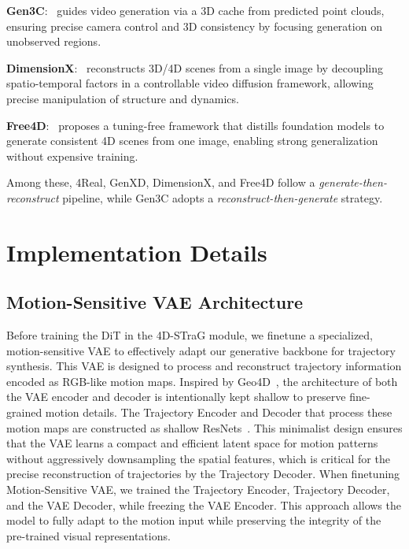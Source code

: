 \noindent\textbf{Gen3C}:~\cite{gen3c} guides video generation via a 3D cache from predicted point clouds, ensuring precise camera control and 3D consistency by focusing generation on unobserved regions.

\noindent\textbf{DimensionX}:~\cite{dimensionX} reconstructs 3D/4D scenes from a single image by decoupling spatio-temporal factors in a controllable video diffusion framework, allowing precise manipulation of structure and dynamics.

\noindent\textbf{Free4D}:~\cite{free4d} proposes a tuning-free framework that distills foundation models to generate consistent 4D scenes from one image, enabling strong generalization without expensive training.

Among these, 4Real, GenXD, DimensionX, and Free4D follow a \textit{generate-then-reconstruct} pipeline, while Gen3C adopts a \textit{reconstruct-then-generate} strategy.




\section{ Implementation Details}
\label{sec:f}
\subsection{Motion-Sensitive VAE Architecture}

Before training the DiT in the 4D-STraG module, we finetune a specialized, motion-sensitive VAE to effectively adapt our generative backbone for trajectory synthesis. This VAE is designed to process and reconstruct trajectory information encoded as RGB-like motion maps. Inspired by Geo4D~\cite{geo4d}, the architecture of both the VAE encoder and decoder is intentionally kept shallow to preserve fine-grained motion details. The Trajectory Encoder and Decoder that process these motion maps are constructed as shallow ResNets~\cite{resnet}. This minimalist design ensures that the VAE learns a compact and efficient latent space for motion patterns without aggressively downsampling the spatial features, which is critical for the precise reconstruction of trajectories by the Trajectory Decoder. When finetuning Motion-Sensitive VAE, we trained the Trajectory Encoder, Trajectory Decoder, and the VAE Decoder, while freezing the VAE Encoder. This approach allows the model to fully adapt to the motion input while preserving the integrity of the pre-trained visual representations.


